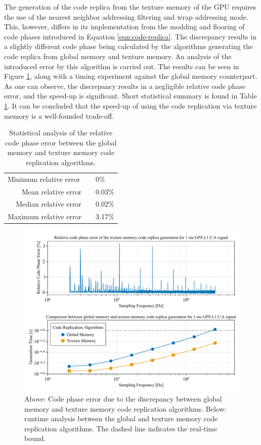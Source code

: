 \documentclass{juliacon}
\begin{document}
The generation of the code replica from the texture memory of the GPU requires the use of the nearest neighbor addressing filtering and wrap addressing mode. This, however, differs in its implementation from the modding and flooring of code phases introduced in Equation \ref{eqn:code-replica}. The discrepancy results in a slightly different code phase being calculated by the algorithms generating the code replica from global memory and texture memory. An analysis of the introduced error by this algorithm is carried out. The results can be seen in Figure \ref{fig:code-phase}, along with a timing experiment against the global memory counterpart. As one can observe, the discrepancy results in a negligible relative code phase error, and the speed-up is significant. Short statistical summary is found in Table \ref{tab:code-phase-error}. It can be  concluded that the speed-up of using the code replication via texture memory is a well-founded trade-off. 

\begin{table}
  \centering
  \caption{\label{tab:code-phase-error} Statistical analysis of the relative code phase error between the global memory and texture memory code replication algorithms.}
  \begin{tabular}{rcl}
  \multicolumn{1}{l}{Minimum relative error} & \multicolumn{1}{l}{} & 0\%                       \\
  Mean relative error                        &                      & 0.03\%  \\
  Median relative error                      &                      & 0.02\%  \\
  Maximum relative error                     &                      & 3.17\% 
  \end{tabular}
\end{table}

\begin{figure}[h]
  \centering
  \includegraphics[width = 13cm]{code_phase.pdf}
  \caption{Above: Code phase error due to the discrepancy between global memory and texture memory code replication algorithms. Below: runtime analysis between the global and texture memory code replication algorithms. The dashed line indicates the real-time bound.\label{fig:code-phase}}
\end{figure}
\end{document}
